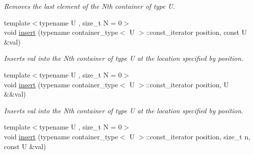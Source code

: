 \begin{DoxyCompactItemize}
\begin{DoxyCompactList}\small\item\em Removes the last element of the Nth container of type U. \end{DoxyCompactList}\item 
\hypertarget{classheterogeneous_1_1heterovector_3_01_t_00_01_types_8_8_8_4_a50b101d960180871df1d25efa2f4d51a}{}{\footnotesize template$<$typename U , size\+\_\+t N = 0$>$ }\\void \hyperlink{classheterogeneous_1_1heterovector_3_01_t_00_01_types_8_8_8_4_a50b101d960180871df1d25efa2f4d51a}{insert} (typename container\+\_\+type$<$ U $>$\+::const\+\_\+iterator position, const U \&val)\label{classheterogeneous_1_1heterovector_3_01_t_00_01_types_8_8_8_4_a50b101d960180871df1d25efa2f4d51a}

\begin{DoxyCompactList}\small\item\em Inserts val into the Nth container of type U at the location specified by position. \end{DoxyCompactList}\item 
\hypertarget{classheterogeneous_1_1heterovector_3_01_t_00_01_types_8_8_8_4_ad6cf66861b048603720f7ec85bad54bb}{}{\footnotesize template$<$typename U , size\+\_\+t N = 0$>$ }\\void \hyperlink{classheterogeneous_1_1heterovector_3_01_t_00_01_types_8_8_8_4_ad6cf66861b048603720f7ec85bad54bb}{insert} (typename container\+\_\+type$<$ U $>$\+::const\+\_\+iterator position, U \&\&val)\label{classheterogeneous_1_1heterovector_3_01_t_00_01_types_8_8_8_4_ad6cf66861b048603720f7ec85bad54bb}

\begin{DoxyCompactList}\small\item\em Inserts val into the Nth container of type U at the location specified by position. \end{DoxyCompactList}\item 
\hypertarget{classheterogeneous_1_1heterovector_3_01_t_00_01_types_8_8_8_4_a92810030e6cc54c3dde6dd760c0475ac}{}{\footnotesize template$<$typename U , size\+\_\+t N = 0$>$ }\\void \hyperlink{classheterogeneous_1_1heterovector_3_01_t_00_01_types_8_8_8_4_a92810030e6cc54c3dde6dd760c0475ac}{insert} (typename container\+\_\+type$<$ U $>$\+::const\+\_\+iterator position, size\+\_\+t n, const U \&val)\label{classheterogeneous_1_1heterovector_3_01_t_00_01_types_8_8_8_4_a92810030e6cc54c3dde6dd760c0475ac}


\end{DoxyCompactItemize}
